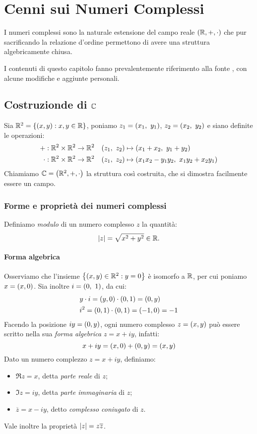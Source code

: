 \chapter{Cenni sui Numeri Complessi}\label{ap:A}
I numeri complessi sono la naturale estensione del campo reale $\qty(\mathbb{R},+,\cdot)$ che pur sacrificando la relazione d'ordine permettono di avere una struttura algebricamente chiusa. \par I contenuti di questo capitolo fanno prevalentemente riferimento alla fonte \cite{Di_Fazio2013-vk}, con alcune modifiche e aggiunte personali.
\section{Costruzionde di $\mathbb{C}$}
Sia $\mathbb{R}^2=\qty{\qty(x,y):x,y\in\mathbb{R}}$, poniamo $z_1=\qty(x_1,\ y_1)$, $z_2=\qty(x_2,\ y_2)$ e siano definite le operazioni:
\begin{align*}
    \func{+}{\R^2\times\R^2}{\R^2}\quad&\qty(z_1,\ z_2)\mapsto\qty(x_1+x_2,\ y_1+y_2)\\
    \func{\cdot}{\R^2\times\R^2}{\R^2}\quad&\qty(z_1,\ z_2)\mapsto\qty(x_1x_2-y_1y_2,\ x_1y_2+x_2y_1)
\end{align*}
Chiamiamo $\mathbb{C}=\qty(\mathbb{R}^2,+,\cdot)$ la struttura cos\`i costruita, che si dimostra facilmente essere un campo.
\subsection{Forme e propriet\`a dei numeri complessi}
    Definiamo \emph{modulo} di un numero complesso $z$ la quantit\`a: $$\abs{z}=\sqrt{x^2+y^2}\in\mathbb{R}.$$ 
    \subsubsection{Forma algebrica}
        Osserviamo che l'insieme $\qty{\qty(x,y)\in\mathbb{R}^2:y=0}$ \`e isomorfo a $\mathbb{R}$, per cui poniamo $x=\qty(x,0)$. Sia inoltre $i=\qty(0,\ 1)$, da cui:
        \begin{align*}
            &y\cdot i=\qty(y,0)\cdot(0,1)=(0,y)\\
            &i^2=\qty(0,1)\cdot\qty(0,1)=(-1,0)=-1
        \end{align*}
        Facendo la posizione $iy=\qty(0,y)$, ogni numero complesso $z=\qty(x,y)$ pu\`o essere scritto nella sua \emph{forma algebrica} $z=x+iy$, infatti: $$x+iy=\qty(x,0)+\qty(0,y)=(x,y)$$
        Dato un numero complezzo $z=x+iy$, definiamo:
        \begin{itemize}
            \item $\Re z=x$, detta \emph{parte reale} di $z$;
            \item $\Im z=iy$, detta \emph{parte immaginaria} di $z$;
            \item $\overline{z}=x-iy$, detto \emph{complesso coniugato} di $z$.
        \end{itemize}
        Vale inoltre la propriet\`a $\abs{z}=z\overline{z}$.
